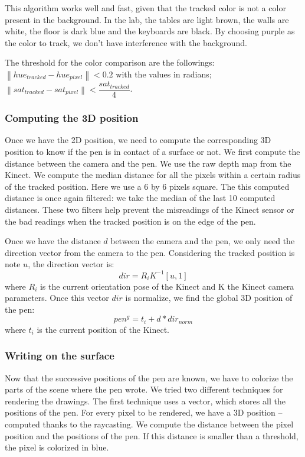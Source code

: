 \documentclass[12pt]{article}
\begin{document}
This algorithm works well and fast, given that the tracked color is not a color present in the background. In the lab, the tables are light brown, the walls are white, the floor is dark blue and the keyboards are black. By choosing purple as the color to track, we don't have interference with the background.

The threshold for the color comparison are the followings: $\left\| hue_{tracked} - hue_{pixel}\right\| < 0.2$ with the values in radians; $\left\| sat_{tracked} - sat_{pixel}\right\| < \dfrac{sat_{tracked}}{4}$.

\subsubsection{Computing the 3D position}
Once we have the 2D position, we need to compute the corresponding 3D position to know if the pen is in contact of a surface or not. We first compute the distance between the camera and the pen. We use the raw depth map from the Kinect. We compute the median distance for all the pixels within a certain radius of the tracked position. Here we use a 6 by 6 pixels square. The this computed distance is once again filtered: we take the median of the last 10 computed distances. These two filters help prevent the misreadings of the Kinect sensor or the bad readings when the tracked position is on the edge of the pen.

Once we have the distance $d$ between the camera and the pen, we only need the direction vector from the camera to the pen. Considering the tracked position is note $u$, the direction vector is:
$$dir = R_iK^{-1}[u,1]$$
where $R_i$ is the current orientation pose of the Kinect and K the Kinect camera parameters. Once this vector $dir$ is normalize, we find the global 3D position of the pen:
$$pen^g = t_i + d*dir_{norm}$$
where $t_i$ is the current position of the Kinect.

\subsubsection{Writing on the surface}
Now that the successive positions of the pen are known, we have to colorize the parts of the scene where the pen wrote. We tried two different techniques for rendering the drawings. The first technique uses a vector, which stores all the positions of the pen. For every pixel to be rendered, we have a 3D position -- computed thanks to the raycasting. We compute the distance between the pixel position and the positions of the pen. If this distance is smaller than a threshold, the pixel is colorized in blue.
\end{document}
